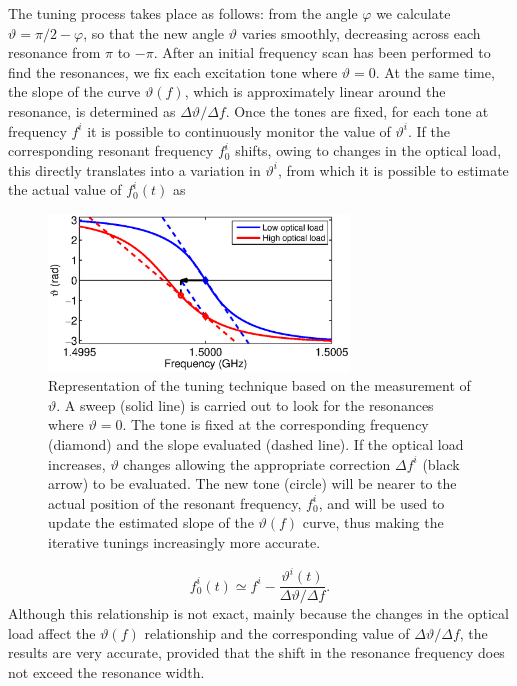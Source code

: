 The tuning process takes place as follows: from the angle $\varphi$ we calculate $\vartheta = \pi/2 - \varphi$, so that the new angle $\vartheta$ varies smoothly, decreasing across each resonance from $\pi$ to $-\pi$. After an initial frequency scan has been performed to find the resonances, we fix each excitation tone where $\vartheta=0$. At the same time, the slope of the curve $\vartheta(f)$, which is approximately linear around the resonance, is determined as  $\Delta\vartheta/\Delta f$. Once the tones are fixed, for each tone at frequency $f^i$ it is possible to continuously monitor the value of $\vartheta^i$. If the corresponding resonant frequency $f_0^i$ shifts, owing to changes in the optical load, this directly translates into a variation in $\vartheta^i$, from which it is possible to estimate the actual value of $f_0^i(t)$ as
\begin{figure}[t!]
\begin{center}
\includegraphics[bb = 98 305 490 509,width=8cm, clip]{figures/fig_sweepAngle.eps}
\end{center}
  \caption{Representation of the tuning technique based on the measurement of $\vartheta$. A sweep (solid line) is carried out to look for the resonances where $\vartheta=0$. The tone is fixed at the corresponding frequency (diamond) and the slope evaluated (dashed line). If the optical load increases, $\vartheta$ changes allowing the appropriate correction $\Delta f^i$ (black arrow) to be evaluated. The new tone (circle) will be nearer to the actual position of the resonant frequency, $f_0^i$, and will be used to update the estimated slope of the $\vartheta(f)$ curve, thus making the iterative tunings increasingly more accurate.}
\label{fig:sweep}
\end{figure}
\begin{equation}
f_0^i(t)\simeq {f^i} - \frac{\vartheta^i(t)}{\Delta\vartheta/\Delta f}.
\label{eq:tuning}
\end{equation}
Although this relationship is not exact, mainly because the
changes in the optical load affect the $\vartheta(f)$ relationship and the
corresponding value of $\Delta\vartheta/\Delta f$, the results are very accurate,
provided that the shift in the resonance frequency does not exceed the
resonance width.

